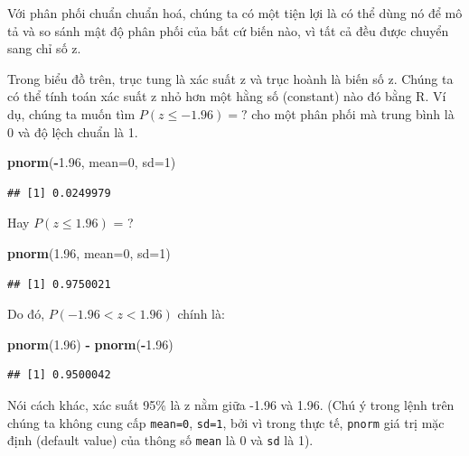 \documentclass[
]{book}
\newenvironment{Shaded}{\begin{snugshade}}{\end{snugshade}}
\newcommand{\DataTypeTok}[1]{\textcolor[rgb]{0.13,0.29,0.53}{#1}}
\newcommand{\DecValTok}[1]{\textcolor[rgb]{0.00,0.00,0.81}{#1}}
\newcommand{\FloatTok}[1]{\textcolor[rgb]{0.00,0.00,0.81}{#1}}
\newcommand{\KeywordTok}[1]{\textcolor[rgb]{0.13,0.29,0.53}{\textbf{#1}}}
\newcommand{\NormalTok}[1]{#1}
\newcommand{\OperatorTok}[1]{\textcolor[rgb]{0.81,0.36,0.00}{\textbf{#1}}}
\newcommand{\StringTok}[1]{\textcolor[rgb]{0.31,0.60,0.02}{#1}}
\begin{document}
Với phân phối chuẩn chuẩn hoá, chúng ta có một tiện lợi là có thể dùng nó để mô tả và so sánh mật độ phân phối của bất cứ biến nào, vì tất cả đều được chuyển sang chỉ số z.

Trong biểu đồ trên, trục tung là xác suất z và trục hoành là biến số z. Chúng ta có thể tính toán xác suất z nhỏ hơn một hằng số (constant) nào đó bằng R. Ví dụ, chúng ta muốn tìm \(P(z ≤ -1.96) = ?\) cho một phân phối mà trung bình là 0 và độ lệch chuẩn là 1.

\begin{Shaded}
\begin{Highlighting}[]
\KeywordTok{pnorm}\NormalTok{(}\OperatorTok{{-}}\FloatTok{1.96}\NormalTok{, }\DataTypeTok{mean=}\DecValTok{0}\NormalTok{, }\DataTypeTok{sd=}\DecValTok{1}\NormalTok{)}
\end{Highlighting}
\end{Shaded}

\begin{verbatim}
## [1] 0.0249979
\end{verbatim}

Hay \(P(z ≤ 1.96)\) = ?

\begin{Shaded}
\begin{Highlighting}[]
\KeywordTok{pnorm}\NormalTok{(}\FloatTok{1.96}\NormalTok{, }\DataTypeTok{mean=}\DecValTok{0}\NormalTok{, }\DataTypeTok{sd=}\DecValTok{1}\NormalTok{)}
\end{Highlighting}
\end{Shaded}

\begin{verbatim}
## [1] 0.9750021
\end{verbatim}

Do đó, \(P(-1.96 < z < 1.96)\) chính là:

\begin{Shaded}
\begin{Highlighting}[]
\KeywordTok{pnorm}\NormalTok{(}\FloatTok{1.96}\NormalTok{) }\OperatorTok{{-}}\StringTok{ }\KeywordTok{pnorm}\NormalTok{(}\OperatorTok{{-}}\FloatTok{1.96}\NormalTok{)}
\end{Highlighting}
\end{Shaded}

\begin{verbatim}
## [1] 0.9500042
\end{verbatim}

Nói cách khác, xác suất 95\% là z nằm giữa -1.96 và 1.96. (Chú ý trong lệnh trên chúng ta không cung cấp \texttt{mean=0}, \texttt{sd=1}, bởi vì trong thực tế, \texttt{pnorm} giá trị mặc định (default value) của thông số \texttt{mean} là 0 và \texttt{sd} là 1).
\end{document}
